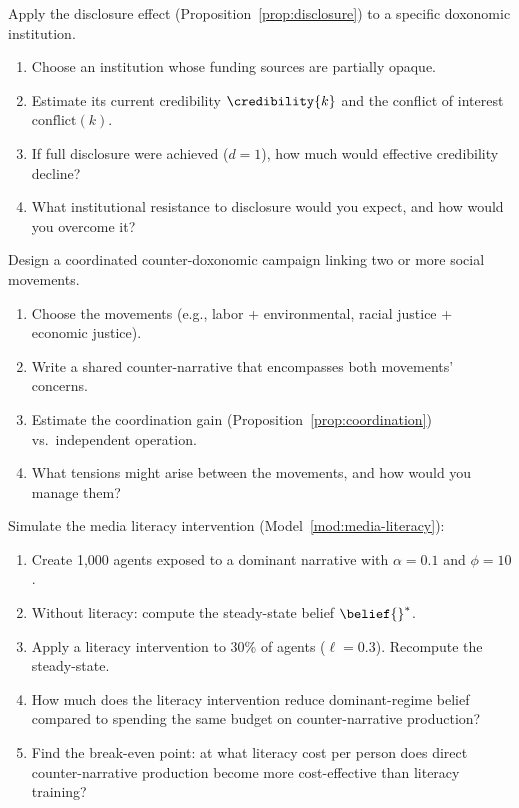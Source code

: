 \begin{exercise}
Apply the disclosure effect (Proposition~\ref{prop:disclosure}) to a specific doxonomic institution.
\begin{enumerate}[nosep]
  \item Choose an institution whose funding sources are partially opaque.
  \item Estimate its current credibility $\credibility{k}$ and the conflict of interest $\text{conflict}(k)$.
  \item If full disclosure were achieved ($d = 1$), how much would effective credibility decline?
  \item What institutional resistance to disclosure would you expect, and how would you overcome it?
\end{enumerate}
\end{exercise}

\begin{exercise}
Design a coordinated counter-doxonomic campaign linking two or more social movements.
\begin{enumerate}[nosep]
  \item Choose the movements (e.g., labor + environmental, racial justice + economic justice).
  \item Write a shared counter-narrative that encompasses both movements' concerns.
  \item Estimate the coordination gain (Proposition~\ref{prop:coordination}) vs.\ independent operation.
  \item What tensions might arise between the movements, and how would you manage them?
\end{enumerate}
\end{exercise}

\begin{exercise}[Computational]
Simulate the media literacy intervention (Model~\ref{mod:media-literacy}):
\begin{enumerate}[nosep]
  \item Create 1,000 agents exposed to a dominant narrative with $\alpha = 0.1$ and $\phi = 10$.
  \item Without literacy: compute the steady-state belief $\belief{}^*$.
  \item Apply a literacy intervention to 30\% of agents ($\ell = 0.3$). Recompute the steady-state.
  \item How much does the literacy intervention reduce dominant-regime belief compared to spending the same budget on counter-narrative production?
  \item Find the break-even point: at what literacy cost per person does direct counter-narrative production become more cost-effective than literacy training?
\end{enumerate}
\end{exercise}
